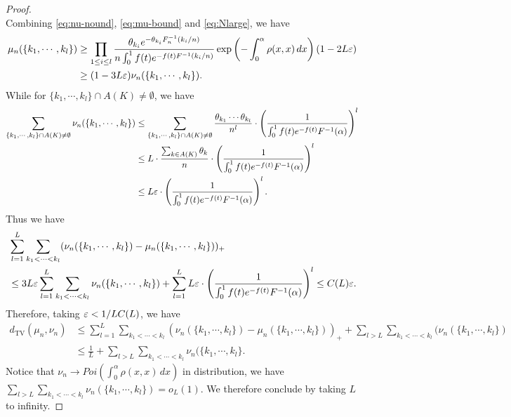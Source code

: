 \documentclass[10pt]{article}
\DeclareMathOperator{\TV}{\mathrm{TV}}
\numberwithin{equation}{section}
\begin{document}
\begin{proof}
\begin{equation}
        \end{equation}
        Combining \eqref{eq:nu-nound}, \eqref{eq:mu-bound} and \eqref{eq:Nlarge}, we have
        \begin{align*}
            \mu_n(\{k_1,\cdots,k_l\})
            &\geq \prod_{1\leq i\leq l} \frac{\theta_{k_i}e^{-\theta_{k_i}F_n^{-1}(k_i/n)}}{n\int_0^1f(t)e^{-f(t)F^{-1}(k_i/n)}} \exp\left(-\int_0^\alpha \rho (x,x) \,dx \right) (1-2L\varepsilon)\\
            &\geq (1-3L\varepsilon) \nu_n(\{k_1,\cdots,k_l\}).
        \end{align*}
        While for $\{k_1,\cdots,k_l\}\cap A(K)\neq \emptyset$, we have
        \begin{align*}
            \sum_{\{k_1,\cdots,k_l\}\cap A(K)\neq \emptyset} \nu_n(\{k_1,\cdots,k_l\}) 
            &\leq \sum_{\{k_1,\cdots,k_l\}\cap A(K)\neq \emptyset} \frac{\theta_{k_1}\cdots \theta_{k_l}}{n^l}\cdot\left( \frac{1}{\int_{0}^1 f(t)e^{-f(t)} F^{-1}(\alpha)}\right)^l
            \\
            &\leq L\cdot \frac{\sum_{k\in A(K)}\theta_k}{n}\cdot\left( \frac{1}{\int_{0}^1 f(t)e^{-f(t)} F^{-1}(\alpha)}\right)^l
            \\
            &\leq
            L\varepsilon\cdot\left( \frac{1}{\int_{0}^1 f(t)e^{-f(t)} F^{-1}(\alpha)}\right)^l.
        \end{align*}        
        Thus we have
        \begin{align*}
            &\sum_{l=1}^L\sum_{k_1<\cdots<k_l}(\nu_n(\{k_1,\cdots,k_l\})-\mu_n(\{k_1,\cdots,k_l\}))_+ \\
            &\leq 3L\varepsilon\sum_{l=1}^L\sum_{k_1<\cdots<k_l}\nu_n(\{k_1,\cdots,k_l\})+\sum_{l=1}^LL\varepsilon\cdot\left( \frac{1}{\int_{0}^1 f(t)e^{-f(t)} F^{-1}(\alpha)}\right)^l\leq C(L)\varepsilon.
        \end{align*}
        Therefore, taking $\varepsilon < 1/LC(L)$, we have
        \begin{align}
            d_{\TV}(\mu_n,\nu_n)&\leq \sum_{l=1}^L\sum_{k_1<\cdots<k_l}(\nu_n(\{k_1,\cdots,k_l\})-\mu_n(\{k_1,\cdots,k_l\}))_+ + \sum_{l>L}\sum_{k_1<\cdots<k_l}(\nu_n(\{k_1,\cdots,k_l\})
            \\
            &\leq \frac{1}{L} + \sum_{l>L}\sum_{k_1<\cdots<k_l}\nu_n(\{k_1,\cdots,k_l\}.
        \end{align}
        Notice that $\nu_n\to Poi(\int_0^\alpha \rho(x,x)\,dx)$ in distribution, we have $\sum_{l>L}\sum_{k_1<\cdots<k_l}\nu_n(\{k_1,\cdots,k_l\})=o_L(1)$. We therefore conclude by taking $L$ to infinity. 
    \end{proof}
\end{document}
